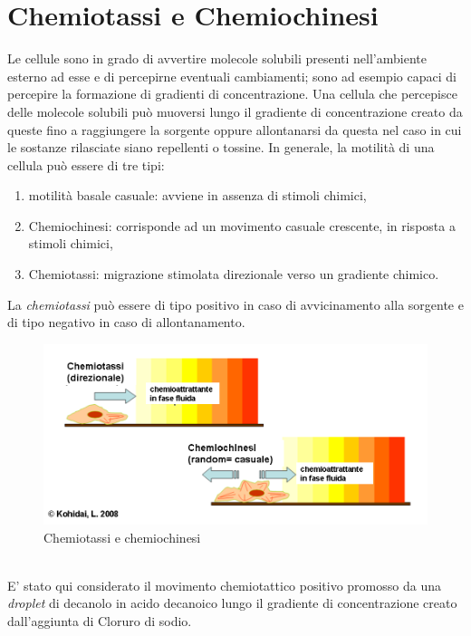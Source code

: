 \section{Chemiotassi e Chemiochinesi}
\label{sec:456}
Le cellule sono in grado di avvertire molecole solubili presenti nell'ambiente esterno ad esse e di percepirne eventuali cambiamenti; sono ad esempio capaci di percepire la formazione di gradienti di concentrazione. 
Una cellula che percepisce delle molecole solubili può muoversi lungo il gradiente di concentrazione creato da queste fino a raggiungere la sorgente oppure allontanarsi da questa nel caso in cui le sostanze rilasciate siano repellenti o tossine.
In generale, la motilità di una cellula può essere di tre tipi:
\begin{enumerate}
\item motilità basale casuale: avviene in assenza di stimoli chimici,
\item Chemiochinesi: corrisponde ad un movimento casuale crescente, in risposta a stimoli chimici,
\item Chemiotassi: migrazione stimolata direzionale verso un gradiente chimico.
\end{enumerate}
La \emph{chemiotassi} può essere di tipo positivo in caso di avvicinamento alla sorgente e di tipo negativo in caso di allontanamento.
	\begin{figure}[h]
	  \includegraphics[scale=0.50]{immagini/chemochin.png}
		\centering	
	 \caption{Chemiotassi e chemiochinesi}
	\end{figure}
\pagebreak
\\E' stato qui considerato il movimento chemiotattico positivo promosso da una \emph{droplet} di decanolo in acido decanoico lungo il gradiente di concentrazione creato dall'aggiunta di Cloruro di sodio.
